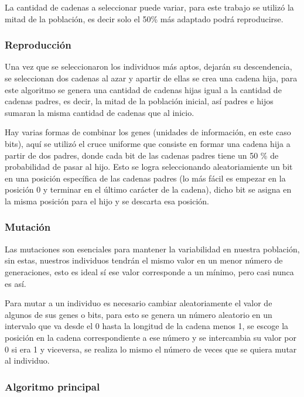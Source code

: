 \documentclass[12pt,letterpaper]{article}
\begin{document}
La cantidad de cadenas a seleccionar puede variar, para este trabajo se utilizó la mitad de la población, es decir solo el 50\% más adaptado podrá reproducirse.

\subsubsection*{Reproducción}

Una vez que se seleccionaron los individuos más aptos, dejarán su descendencia, se seleccionan dos cadenas al azar y apartir de ellas se crea una cadena hija, para este algoritmo se genera una cantidad de cadenas hijas igual a la cantidad de cadenas padres, es decir, la mitad de la población inicial, así padres e hijos sumaran la misma cantidad de cadenas que al inicio.

Hay varias formas de combinar los genes (unidades de información, en este caso bits), aquí se utilizó el cruce uniforme que consiste en formar una cadena hija a partir de dos padres, donde cada bit de las cadenas padres tiene un 50 \% de probabilidad de pasar al hijo. Esto se logra seleccionando aleatoriamiente un bit en una posición específica de las cadenas padres (lo más fácil es empezar en la posición 0 y terminar en el último carácter de la cadena), dicho bit se asigna en la misma posición para el hijo y se descarta esa posición.

\subsubsection*{Mutación}

Las mutaciones son esenciales para mantener la variabilidad en nuestra población, sin estas, nuestros individuos tendrán el mismo valor en un menor número de generaciones, esto es ideal sí ese valor corresponde a un mínimo, pero casi nunca es así.

Para mutar a un individuo es necesario cambiar aleatoriamente el valor de algunos de sus genes o bits, para esto se genera un número aleatorio en un intervalo que va desde el 0 hasta la longitud de la cadena menos 1, se escoge la posición en la cadena correspondiente a ese número y se intercambia su valor por 0 si era 1 y viceversa, se realiza lo mismo el número de veces que se quiera mutar al individuo.

\subsubsection*{Algoritmo principal}
\end{document}
